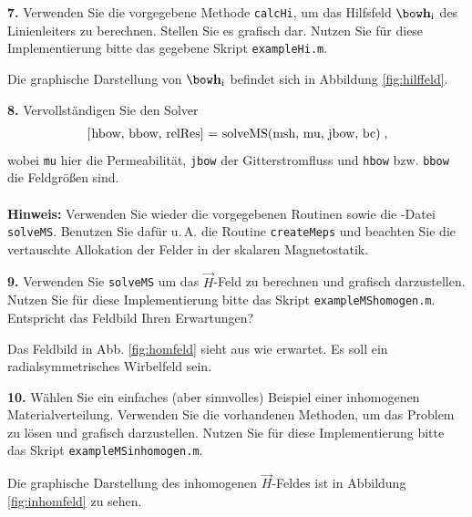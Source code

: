 \documentclass[Protokollheft.tex]{subfiles}
\begin{document}
\begin{framed}
	\noindent \textbf{7.} Verwenden Sie die vorgegebene Methode \lstinline{calcHi}, um das Hilfsfeld $\hfit_{\text{i}}$ des Linienleiters zu berechnen.
Stellen Sie es grafisch dar. Nutzen Sie für diese Implementierung bitte das gegebene Skript \lstinline{exampleHi.m}.\label{exer:visualizeHi}
\end{framed}
\noindent
Die graphische Darstellung von $\hfit_{\text{i}}$ befindet sich in Abbildung \ref{fig:hilffeld}.

\begin{framed}
	\noindent \textbf{8.} Vervollständigen Sie den Solver
\begin{align}
\lstinline{[hbow, bbow, relRes] = solveMS(msh, mu, jbow, bc)} \; ,
\end{align}
wobei \lstinline{mu} hier die Permeabilität, \lstinline{jbow} der Gitterstromfluss und
\lstinline{hbow} bzw. \lstinline{bbow} die Feldgrößen sind.\\
\ \\
{\textbf{Hinweis:}} Verwenden Sie wieder die vorgegebenen Routinen sowie die \matlab-Datei \lstinline{solveMS}. Benutzen Sie
dafür u.\,A. die Routine \lstinline{createMeps} und beachten Sie die vertauschte Allokation der Felder in der skalaren Magnetostatik.\label{exer:solveMS}
\end{framed}



\begin{framed}
	\noindent \textbf{9.} Verwenden Sie \lstinline{solveMS} um das $\vec{H}$-Feld zu berechnen und grafisch darzustellen. Nutzen Sie für diese Implementierung bitte das Skript \lstinline{exampleMShomogen.m}. Entspricht das Feldbild Ihren Erwartungen?\label{exer:visualizeHfield}
\end{framed}
\noindent
Das Feldbild in Abb. \ref{fig:homfeld} sieht aus wie erwartet. Es soll ein radialsymmetrisches Wirbelfeld sein.

\begin{framed}
	\noindent \textbf{10.} Wählen Sie ein einfaches (aber sinnvolles) Beispiel einer inhomogenen Materialverteilung. Verwenden Sie die vorhandenen Methoden, um das
Problem zu lösen und grafisch darzustellen. Nutzen Sie für diese Implementierung bitte das Skript \lstinline{exampleMSinhomogen.m}.\label{exer:Hfield4inhomogenMaterial}
\end{framed}
\noindent
Die graphische Darstellung des inhomogenen $\vec{H}$-Feldes ist in Abbildung \ref{fig:inhomfeld} zu sehen.
\end{document}

